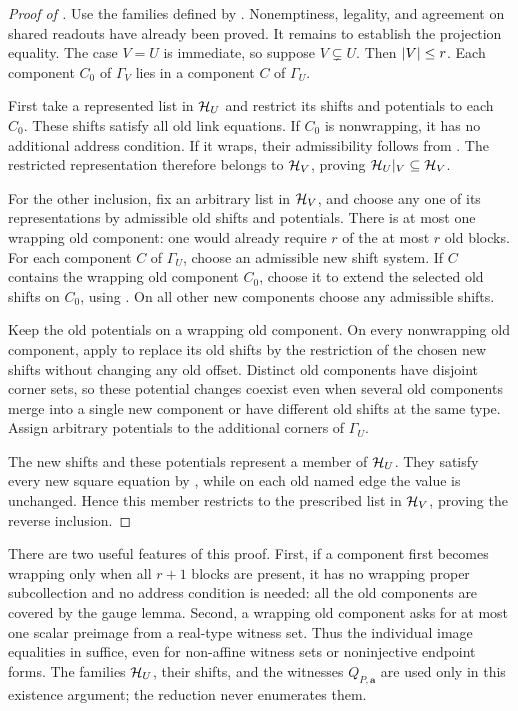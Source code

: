 \begin{proof}[Proof of ]
Use the families defined by . Nonemptiness,
legality, and agreement on shared readouts have already been proved.
It remains to establish the projection equality. The case \(V=U\)
is immediate, so suppose \(V\subsetneq U\). Then \(\lvert V\rvert\le r\).
Each component \(C_0\) of \(\Gamma_V\) lies in a component \(C\) of
\(\Gamma_U\).

First take a represented list in \(\mathcal H_U\) and restrict its shifts and
potentials to each \(C_0\). These shifts satisfy all old link equations.
If \(C_0\) is nonwrapping, it has no additional address condition.
If it wraps, their admissibility follows from
. The restricted representation therefore
belongs to \(\mathcal H_V\), proving
\(\mathcal H_U|_V\subseteq\mathcal H_V\).

For the other inclusion, fix an arbitrary list in \(\mathcal H_V\), and choose
any one of its representations by admissible old shifts and potentials.
There is at most one wrapping old component: one would already require
\(r\) of the at most \(r\) old blocks.
For each component \(C\) of \(\Gamma_U\), choose an admissible new shift
system. If \(C\) contains the wrapping old component \(C_0\), choose it
to extend the selected old shifts on \(C_0\), using
. On all other new components choose any
admissible shifts.

Keep the old potentials on a wrapping old component. On every
nonwrapping old component, apply  to replace its
old shifts by the restriction of the chosen new shifts without changing
any old offset. Distinct old components have disjoint corner sets,
so these potential changes coexist even when several old components
merge into a single new component or have different old shifts at the
same type. Assign arbitrary potentials to the additional corners of
\(\Gamma_U\).

The new shifts and these potentials represent a member of \(\mathcal H_U\).
They satisfy every new square equation by
, while on each old named edge the value is
unchanged. Hence this member restricts to the prescribed list in
\(\mathcal H_V\), proving the reverse inclusion.
\end{proof}

There are two useful features of this proof. First, if a component
first becomes wrapping only when all \(r+1\) blocks are present, it has
no wrapping proper subcollection and no address condition is needed:
all the old components are covered by the gauge lemma. Second, a
wrapping old component asks for at most one scalar preimage from a
real-type witness set. Thus the individual image equalities in
 suffice, even for non-affine witness sets
or noninjective endpoint forms. The families \(\mathcal H_U\), their shifts,
and the witnesses \(Q_{P,\mathbf a}\) are used only in this existence
argument; the reduction never enumerates them.
